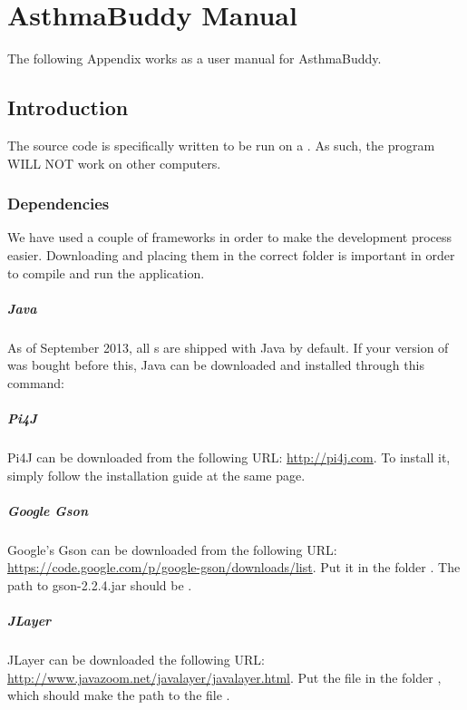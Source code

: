 \chapter{AsthmaBuddy Manual}
\label{app:asthmabuddy_manual}

The following Appendix works as a user manual for AsthmaBuddy.

\section{Introduction}
The source code is specifically written to be run on a \rpi{}. As such, the program WILL NOT work on other computers.

\subsection{Dependencies}
\label{sec:dependencies} 
We have used a couple of frameworks in order to make the development process easier. Downloading and placing them in the correct folder is important in order to compile and run the application. 

\paragraph{Java}
As of September 2013, all \rpi{}s are shipped with Java by default. If your version of \rpi{} was bought before this, Java can be downloaded and installed through this command: 


\paragraph{Pi4J}
Pi4J can be downloaded from the following URL: \url{http://pi4j.com}. To install it, simply follow the installation guide at the same page. 

\paragraph{Google Gson}
Google's Gson can be downloaded from the following URL: \url{https://code.google.com/p/google-gson/downloads/list}. Put it in the folder . 
The path to gson-2.2.4.jar should be .

\paragraph{JLayer}
JLayer can be downloaded the following URL: \url{http://www.javazoom.net/javalayer/javalayer.html}. Put the file  in the folder , which should make the path to the file .  

